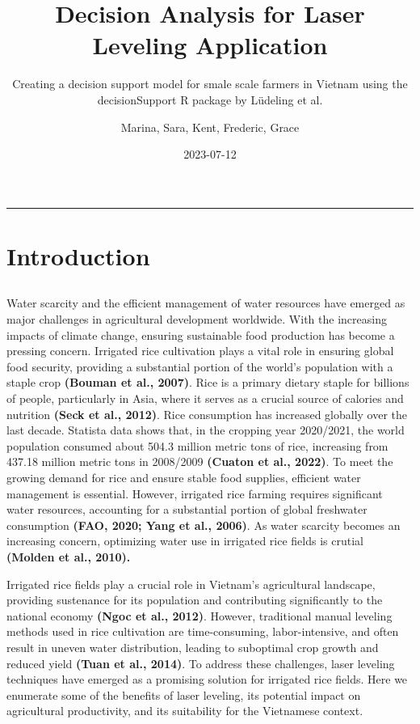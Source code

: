 \documentclass[
]{article}
\title{Decision Analysis for Laser Leveling Application}
\subtitle{Creating a decision support model for smale scale farmers in
Vietnam using the decisionSupport R package by Lüdeling et al.}
\author{Marina, Sara, Kent, Frederic, Grace}
\date{2023-07-12}
\begin{document}
\maketitle

\begin{center}\rule{0.5\linewidth}{0.5pt}\end{center}

\hypertarget{introduction}{%
\section{Introduction}\label{introduction}}

\hypertarget{section}{%
\subsection{}\label{section}}

Water scarcity and the efficient management of water resources have
emerged as major challenges in agricultural development worldwide. With
the increasing impacts of climate change, ensuring sustainable food
production has become a pressing concern. Irrigated rice cultivation
plays a vital role in ensuring global food security, providing a
substantial portion of the world's population with a staple crop
\textbf{(Bouman et al., 2007)}. Rice is a primary dietary staple for
billions of people, particularly in Asia, where it serves as a crucial
source of calories and nutrition \textbf{(Seck et al., 2012)}. Rice
consumption has increased globally over the last decade. Statista data
shows that, in the cropping year 2020/2021, the world population
consumed about 504.3 million metric tons of rice, increasing from 437.18
million metric tons in 2008/2009 \textbf{(Cuaton et al., 2022)}. To meet
the growing demand for rice and ensure stable food supplies, efficient
water management is essential. However, irrigated rice farming requires
significant water resources, accounting for a substantial portion of
global freshwater consumption \textbf{(FAO, 2020; Yang et al., 2006)}.
As water scarcity becomes an increasing concern, optimizing water use in
irrigated rice fields is crutial \textbf{(Molden et al., 2010).}

Irrigated rice fields play a crucial role in Vietnam's agricultural
landscape, providing sustenance for its population and contributing
significantly to the national economy \textbf{(Ngoc et al., 2012)}.
However, traditional manual leveling methods used in rice cultivation
are time-consuming, labor-intensive, and often result in uneven water
distribution, leading to suboptimal crop growth and reduced yield
\textbf{(Tuan et al., 2014)}. To address these challenges, laser
leveling techniques have emerged as a promising solution for irrigated
rice fields. Here we enumerate some of the benefits of laser leveling,
its potential impact on agricultural productivity, and its suitability
for the Vietnamese context.
\end{document}
